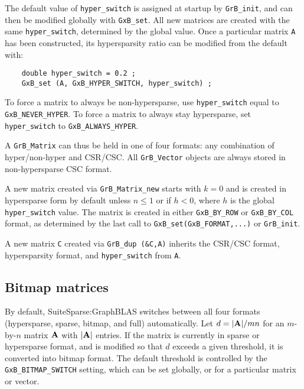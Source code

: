\documentclass[12pt]{article}
\begin{document}
The default value of \verb'hyper_switch' is assigned at startup by
\verb'GrB_init', and can then be modified globally with \verb'GxB_set'.  All
new matrices are created with the same \verb'hyper_switch', determined by the
global value.  Once a particular matrix \verb'A' has been constructed, its
hypersparsity ratio can be modified from the default with:

    {\footnotesize
    \begin{verbatim}
    double hyper_switch = 0.2 ;
    GxB_set (A, GxB_HYPER_SWITCH, hyper_switch) ; \end{verbatim}}

To force a matrix to always be non-hypersparse, use \verb'hyper_switch' equal to
\verb'GxB_NEVER_HYPER'.  To force a matrix to always stay hypersparse, set
\verb'hyper_switch' to \verb'GxB_ALWAYS_HYPER'.

A \verb'GrB_Matrix' can thus be held in one of four formats: any combination of
hyper/non-hyper and CSR/CSC.  All \verb'GrB_Vector' objects are always stored
in non-hypersparse CSC format.

A new matrix created via \verb'GrB_Matrix_new' starts with $k=0$ and is created
in hypersparse form by default unless $n \le 1$ or if $h<0$, where $h$ is the
global \verb'hyper_switch' value.  The matrix is created in either
\verb'GxB_BY_ROW' or \verb'GxB_BY_COL' format, as determined by the last call
to \verb'GxB_set(GxB_FORMAT,...)' or \verb'GrB_init'.

A new matrix \verb'C' created via \verb'GrB_dup (&C,A)' inherits the CSR/CSC
format, hypersparsity format, and \verb'hyper_switch' from \verb'A'.

\subsection{Bitmap matrices}
\label{bitmap_switch}

By default, SuiteSparse:GraphBLAS switches between all four formats
(hypersparse, sparse, bitmap, and full) automatically.  Let $d = |{\bf A}|/mn$
for an $m$-by-$n$ matrix $\bf A$ with $|{\bf A}|$ entries.  If the matrix is
currently in sparse or hypersparse format, and is modified so that $d$ exceeds
a given threshold, it is converted into bitmap format.  The default threshold
is controlled by the \verb'GxB_BITMAP_SWITCH' setting, which can be set
globally, or for a particular matrix or vector.
\end{document}
